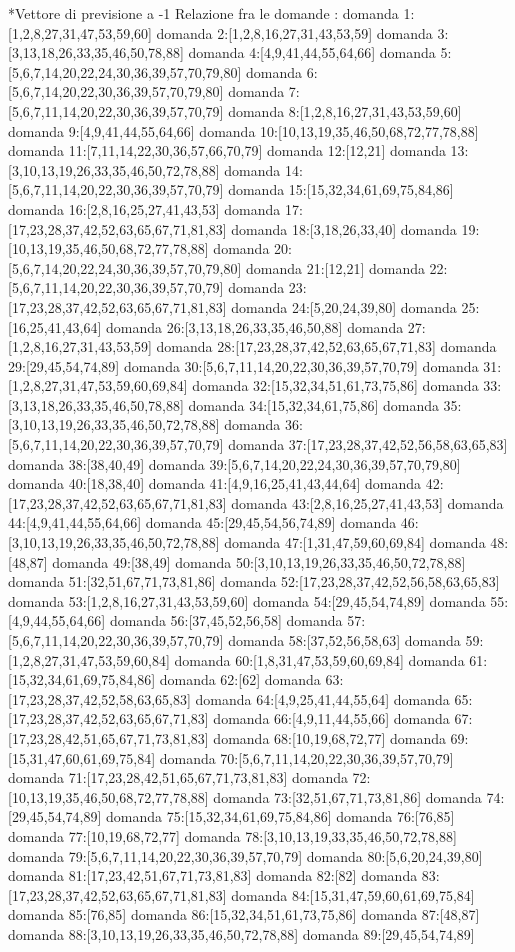 *Vettore di previsione a -1
Relazione fra le domande :
domanda 1:[1,2,8,27,31,47,53,59,60]
domanda 2:[1,2,8,16,27,31,43,53,59]
domanda 3:[3,13,18,26,33,35,46,50,78,88]
domanda 4:[4,9,41,44,55,64,66]
domanda 5:[5,6,7,14,20,22,24,30,36,39,57,70,79,80]
domanda 6:[5,6,7,14,20,22,30,36,39,57,70,79,80]
domanda 7:[5,6,7,11,14,20,22,30,36,39,57,70,79]
domanda 8:[1,2,8,16,27,31,43,53,59,60]
domanda 9:[4,9,41,44,55,64,66]
domanda 10:[10,13,19,35,46,50,68,72,77,78,88]
domanda 11:[7,11,14,22,30,36,57,66,70,79]
domanda 12:[12,21]
domanda 13:[3,10,13,19,26,33,35,46,50,72,78,88]
domanda 14:[5,6,7,11,14,20,22,30,36,39,57,70,79]
domanda 15:[15,32,34,61,69,75,84,86]
domanda 16:[2,8,16,25,27,41,43,53]
domanda 17:[17,23,28,37,42,52,63,65,67,71,81,83]
domanda 18:[3,18,26,33,40]
domanda 19:[10,13,19,35,46,50,68,72,77,78,88]
domanda 20:[5,6,7,14,20,22,24,30,36,39,57,70,79,80]
domanda 21:[12,21]
domanda 22:[5,6,7,11,14,20,22,30,36,39,57,70,79]
domanda 23:[17,23,28,37,42,52,63,65,67,71,81,83]
domanda 24:[5,20,24,39,80]
domanda 25:[16,25,41,43,64]
domanda 26:[3,13,18,26,33,35,46,50,88]
domanda 27:[1,2,8,16,27,31,43,53,59]
domanda 28:[17,23,28,37,42,52,63,65,67,71,83]
domanda 29:[29,45,54,74,89]
domanda 30:[5,6,7,11,14,20,22,30,36,39,57,70,79]
domanda 31:[1,2,8,27,31,47,53,59,60,69,84]
domanda 32:[15,32,34,51,61,73,75,86]
domanda 33:[3,13,18,26,33,35,46,50,78,88]
domanda 34:[15,32,34,61,75,86]
domanda 35:[3,10,13,19,26,33,35,46,50,72,78,88]
domanda 36:[5,6,7,11,14,20,22,30,36,39,57,70,79]
domanda 37:[17,23,28,37,42,52,56,58,63,65,83]
domanda 38:[38,40,49]
domanda 39:[5,6,7,14,20,22,24,30,36,39,57,70,79,80]
domanda 40:[18,38,40]
domanda 41:[4,9,16,25,41,43,44,64]
domanda 42:[17,23,28,37,42,52,63,65,67,71,81,83]
domanda 43:[2,8,16,25,27,41,43,53]
domanda 44:[4,9,41,44,55,64,66]
domanda 45:[29,45,54,56,74,89]
domanda 46:[3,10,13,19,26,33,35,46,50,72,78,88]
domanda 47:[1,31,47,59,60,69,84]
domanda 48:[48,87]
domanda 49:[38,49]
domanda 50:[3,10,13,19,26,33,35,46,50,72,78,88]
domanda 51:[32,51,67,71,73,81,86]
domanda 52:[17,23,28,37,42,52,56,58,63,65,83]
domanda 53:[1,2,8,16,27,31,43,53,59,60]
domanda 54:[29,45,54,74,89]
domanda 55:[4,9,44,55,64,66]
domanda 56:[37,45,52,56,58]
domanda 57:[5,6,7,11,14,20,22,30,36,39,57,70,79]
domanda 58:[37,52,56,58,63]
domanda 59:[1,2,8,27,31,47,53,59,60,84]
domanda 60:[1,8,31,47,53,59,60,69,84]
domanda 61:[15,32,34,61,69,75,84,86]
domanda 62:[62]
domanda 63:[17,23,28,37,42,52,58,63,65,83]
domanda 64:[4,9,25,41,44,55,64]
domanda 65:[17,23,28,37,42,52,63,65,67,71,83]
domanda 66:[4,9,11,44,55,66]
domanda 67:[17,23,28,42,51,65,67,71,73,81,83]
domanda 68:[10,19,68,72,77]
domanda 69:[15,31,47,60,61,69,75,84]
domanda 70:[5,6,7,11,14,20,22,30,36,39,57,70,79]
domanda 71:[17,23,28,42,51,65,67,71,73,81,83]
domanda 72:[10,13,19,35,46,50,68,72,77,78,88]
domanda 73:[32,51,67,71,73,81,86]
domanda 74:[29,45,54,74,89]
domanda 75:[15,32,34,61,69,75,84,86]
domanda 76:[76,85]
domanda 77:[10,19,68,72,77]
domanda 78:[3,10,13,19,33,35,46,50,72,78,88]
domanda 79:[5,6,7,11,14,20,22,30,36,39,57,70,79]
domanda 80:[5,6,20,24,39,80]
domanda 81:[17,23,42,51,67,71,73,81,83]
domanda 82:[82]
domanda 83:[17,23,28,37,42,52,63,65,67,71,81,83]
domanda 84:[15,31,47,59,60,61,69,75,84]
domanda 85:[76,85]
domanda 86:[15,32,34,51,61,73,75,86]
domanda 87:[48,87]
domanda 88:[3,10,13,19,26,33,35,46,50,72,78,88]
domanda 89:[29,45,54,74,89]

